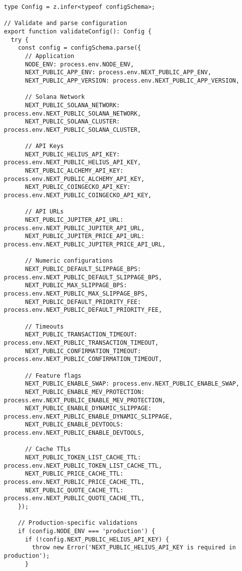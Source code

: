 \documentclass[11pt,a4paper]{article}
\begin{document}
\begin{lstlisting}[style=env, caption=src/utils/config-validation.ts]
type Config = z.infer<typeof configSchema>;

// Validate and parse configuration
export function validateConfig(): Config {
  try {
    const config = configSchema.parse({
      // Application
      NODE_ENV: process.env.NODE_ENV,
      NEXT_PUBLIC_APP_ENV: process.env.NEXT_PUBLIC_APP_ENV,
      NEXT_PUBLIC_APP_VERSION: process.env.NEXT_PUBLIC_APP_VERSION,
      
      // Solana Network
      NEXT_PUBLIC_SOLANA_NETWORK: process.env.NEXT_PUBLIC_SOLANA_NETWORK,
      NEXT_PUBLIC_SOLANA_CLUSTER: process.env.NEXT_PUBLIC_SOLANA_CLUSTER,
      
      // API Keys
      NEXT_PUBLIC_HELIUS_API_KEY: process.env.NEXT_PUBLIC_HELIUS_API_KEY,
      NEXT_PUBLIC_ALCHEMY_API_KEY: process.env.NEXT_PUBLIC_ALCHEMY_API_KEY,
      NEXT_PUBLIC_COINGECKO_API_KEY: process.env.NEXT_PUBLIC_COINGECKO_API_KEY,
      
      // API URLs
      NEXT_PUBLIC_JUPITER_API_URL: process.env.NEXT_PUBLIC_JUPITER_API_URL,
      NEXT_PUBLIC_JUPITER_PRICE_API_URL: process.env.NEXT_PUBLIC_JUPITER_PRICE_API_URL,
      
      // Numeric configurations
      NEXT_PUBLIC_DEFAULT_SLIPPAGE_BPS: process.env.NEXT_PUBLIC_DEFAULT_SLIPPAGE_BPS,
      NEXT_PUBLIC_MAX_SLIPPAGE_BPS: process.env.NEXT_PUBLIC_MAX_SLIPPAGE_BPS,
      NEXT_PUBLIC_DEFAULT_PRIORITY_FEE: process.env.NEXT_PUBLIC_DEFAULT_PRIORITY_FEE,
      
      // Timeouts
      NEXT_PUBLIC_TRANSACTION_TIMEOUT: process.env.NEXT_PUBLIC_TRANSACTION_TIMEOUT,
      NEXT_PUBLIC_CONFIRMATION_TIMEOUT: process.env.NEXT_PUBLIC_CONFIRMATION_TIMEOUT,
      
      // Feature flags
      NEXT_PUBLIC_ENABLE_SWAP: process.env.NEXT_PUBLIC_ENABLE_SWAP,
      NEXT_PUBLIC_ENABLE_MEV_PROTECTION: process.env.NEXT_PUBLIC_ENABLE_MEV_PROTECTION,
      NEXT_PUBLIC_ENABLE_DYNAMIC_SLIPPAGE: process.env.NEXT_PUBLIC_ENABLE_DYNAMIC_SLIPPAGE,
      NEXT_PUBLIC_ENABLE_DEVTOOLS: process.env.NEXT_PUBLIC_ENABLE_DEVTOOLS,
      
      // Cache TTLs
      NEXT_PUBLIC_TOKEN_LIST_CACHE_TTL: process.env.NEXT_PUBLIC_TOKEN_LIST_CACHE_TTL,
      NEXT_PUBLIC_PRICE_CACHE_TTL: process.env.NEXT_PUBLIC_PRICE_CACHE_TTL,
      NEXT_PUBLIC_QUOTE_CACHE_TTL: process.env.NEXT_PUBLIC_QUOTE_CACHE_TTL,
    });
    
    // Production-specific validations
    if (config.NODE_ENV === 'production') {
      if (!config.NEXT_PUBLIC_HELIUS_API_KEY) {
        throw new Error('NEXT_PUBLIC_HELIUS_API_KEY is required in production');
      }
      

\end{lstlisting}
\end{document}
